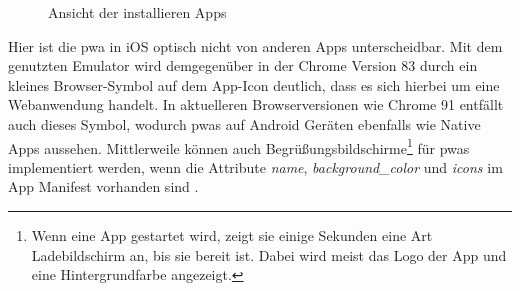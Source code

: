 \begin{figure}[h]
\caption{Ansicht der installieren Apps}
\label{fig:pwa_rn_installed}
\end{figure}

Hier ist die \ac{pwa} in iOS optisch nicht von anderen Apps unterscheidbar.
Mit dem genutzten Emulator wird demgegenüber in der Chrome Version 83 durch ein kleines Browser-Symbol auf dem App-Icon deutlich, dass es sich hierbei um eine Webanwendung handelt.
In aktuelleren Browserversionen wie Chrome 91 entfällt auch dieses Symbol, wodurch \acp{pwa} auf Android Geräten ebenfalls wie Native Apps aussehen.
Mittlerweile können auch Begrüßungsbildschirme\footnote{Wenn eine App gestartet wird, zeigt sie einige Sekunden eine Art Ladebildschirm an, bis sie bereit ist.
Dabei wird meist das Logo der App und eine Hintergrundfarbe angezeigt.} für \acp{pwa} implementiert werden, wenn die Attribute \textit{name}, \textit{background\_color} und \textit{icons} im App Manifest vorhanden sind \cite{LePage.2021}.

